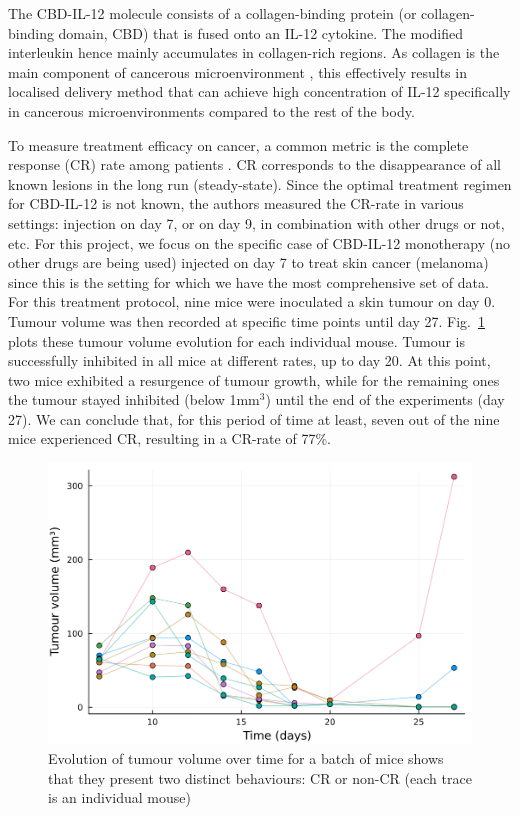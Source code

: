 \documentclass[11pt]{article}
\begin{document}
The CBD-IL-12  molecule consists of a collagen-binding protein (or collagen-binding domain, CBD) that is fused onto an IL-12 cytokine. The modified interleukin hence mainly accumulates in collagen-rich regions. As collagen is the main component of cancerous microenvironment \cite{collagenInCancer}, this effectively results in localised delivery method that can achieve high concentration of IL-12 specifically in cancerous microenvironments compared to the rest of the body.

To measure treatment efficacy on cancer, a common metric is the complete response (CR) rate among patients \cite{cancMetric}. CR corresponds to the disappearance of all known lesions \cite{CRDef} in the long run (steady-state). Since the optimal treatment regimen for CBD-IL-12 is not known, the authors measured the CR-rate in various settings: injection on day 7, or on day 9, in combination with other drugs or not, etc. For this project, we focus on the specific case of CBD-IL-12 monotherapy (no other drugs are being used) injected on day 7 to treat skin cancer (melanoma) since this is the setting for which we have the most comprehensive set of data. For this treatment protocol, nine mice were inoculated a skin tumour on day 0. Tumour volume was then recorded at specific time points until day 27. Fig.~\ref{fig:outcomedual} plots these tumour volume evolution for each individual mouse. Tumour is successfully inhibited in all mice at different rates, up to day 20. At this point, two mice exhibited a resurgence of tumour growth, while for the remaining ones the tumour stayed inhibited (below 1mm$^3$) until the end of the experiments (day 27). We can conclude that, for this period of time at least, seven out of the nine mice experienced CR, resulting in a CR-rate of 77\%. 

\begin{figure}[!ht]
    \centering\includegraphics[scale=0.3]{crnoncr3.png}
    \caption{Evolution of tumour volume over time for a batch of mice shows that they present two distinct behaviours: CR or non-CR (each trace is an individual mouse)}
    \label{fig:outcomedual}
\end{figure}
\end{document}
